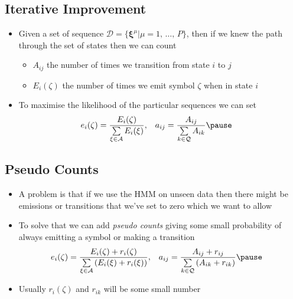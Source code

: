 
\begin{slide}
\section{Iterative Improvement}

\begin{PauseHighLight}
  \begin{itemize}
  \item Given a set of sequence
    $\mathcal{D}=\{\bm{\xi}^\mu|\mu=1,\,\ldots,\,P\}$,
    then if we knew the path through the set of states then we can count
    \begin{itemize}
    \item $A_{ij}$ the number of times we transition from state
      $i$ to $j$\pause
    \item $E_i(\zeta)$ the number of times we emit symbol $\zeta$ when
      in state $i$\pause
    \end{itemize} 
  \item To maximise the likelihood of the particular sequences we can set
    \begin{align*}
      e_i(\zeta) &= \frac{E_i(\zeta)}{\sum\limits_{\xi\in\mathcal{A}} E_i(\xi)},&
      a_{ij} &= \frac{A_{ij}}{\sum\limits_{k\in\mathcal{Q}} A_{ik}}\pause
    \end{align*}
  \end{itemize}
\end{PauseHighLight}

\end{slide}


\begin{slide}
\section{Pseudo Counts}

\begin{PauseHighLight}
  \begin{itemize}
  \item A problem is that if we use the HMM on unseen data then there
    might be emissions or transitions that we've set to zero which we
    want to allow\pause
  \item To solve that we can add \emph{pseudo counts} giving some small
    probability of always emitting a symbol or making a transition
    \begin{align*}
      e_i(\zeta) &= \frac{E_i(\zeta)+ r_i(\zeta)}
        {\sum\limits_{\xi\in\mathcal{A}} \left(E_i(\xi)+r_i(\xi)\right)}, & 
      a_{ij} &= \frac{A_{ij} + r_{ij}}
        {\sum\limits_{k\in\mathcal{Q}} \left(A_{ik}+r_{ik}\right)}\pause
    \end{align*}
  \item Usually $r_i(\zeta)$ and $r_{ik}$ will be some small number\pause
  \end{itemize}
\end{PauseHighLight}

\end{slide}

